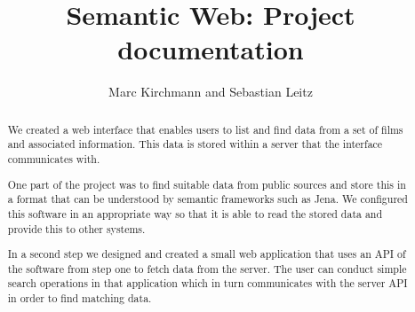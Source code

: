 \documentclass{llncs}
\begin{document}
\title{Semantic Web: Project documentation}

\author{
Marc Kirchmann and Sebastian Leitz}

\maketitle

\begin{abstract}
We created a web interface that enables users to list and find data from a set of films and associated information. This data is stored within a server that the interface communicates with.

One part of the project was to find suitable data from public sources and store this in a format that can be understood by semantic frameworks such as Jena. We configured this software in an appropriate way so that it is able to read the stored data and provide this to other systems.

In a second step we designed and created a small web application that uses an API of the software from step one to fetch data from the server. The user can conduct simple search operations in that application which in turn communicates with the server API in order to find matching data.
\end{abstract}









\end{document}
